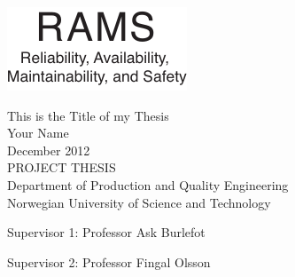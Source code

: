 \thispagestyle{empty}
\includegraphics[scale=1.1]{fig/rams}
\mbox{}\\[6pc]
\begin{center}
\Huge{This is the Title of my Thesis}\\[2pc]

\Large{Your Name}\\[1pc]
\large{December 2012}\\[2pc]

PROJECT THESIS\\
Department of Production and Quality Engineering\\
Norwegian University of Science and Technology
\end{center}
\vfill

\noindent Supervisor 1: Professor Ask Burlefot

\noindent Supervisor 2: Professor Fingal Olsson

